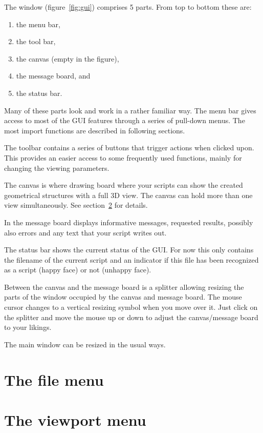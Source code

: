 The \pyf window (figure~\ref{fig:gui}) comprises 5 parts. From top to bottom these are:
\begin{enumerate}
\item the menu bar,
\item the tool bar,
\item the canvas (empty in the figure),
\item the message board, and
\item the status bar.
\end{enumerate}

Many of these parts look and work in a rather familiar way. The menu bar gives access to most of the \pyf GUI features through a series of pull-down menus.
The most import functions are described in following sections.

The toolbar contains a series of buttons that trigger actions when clicked upon. This provides an easier access to some frequently used functions, mainly for changing the viewing parameters.

The canvas is where drawing board where your \pyf scripts can show the created geometrical structures with a full 3D view. The canvas can hold more than one view simultaneously. See section~\ref{sec:viewport-menu} for details.

In the message board \pyf displays informative messages, requested results, possibly also errors and any text that your \pyf script writes out.

The status bar shows the current status of the GUI. For now this only contains the filename of the current script and an indicator if this file has been recognized as a \pyf script (happy face) or not (unhappy face).


Between the canvas and the message board is a splitter allowing resizing the parts of the window occupied by the canvas and message board. The mouse cursor changes to a vertical resizing symbol when you move over it. Just click on the splitter and move the mouse up or down to adjust the canvas/message board to your likings. 

The \pyf main window can be resized in the usual ways. 

   
\section{The file menu}
\label{sec:file-menu}


   
\section{The viewport menu}
\label{sec:viewport-menu}



